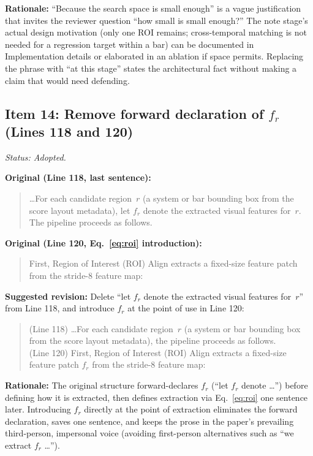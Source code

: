 \documentclass{article}
\begin{document}
\textbf{Rationale:}
``Because the search space is small enough'' is a vague justification that invites the reviewer question ``how small is small enough?'' The note stage's actual design motivation (only one ROI remains; cross-temporal matching is not needed for a regression target within a bar) can be documented in Implementation details or elaborated in an ablation if space permits. Replacing the phrase with ``at this stage'' states the architectural fact without making a claim that would need defending.

\subsection*{Item 14: Remove forward declaration of $f_r$ (Lines 118 and 120)}

\textit{Status: Adopted.}

\textbf{Original (Line 118, last sentence):}
\begin{quote}
\ldots For each candidate region~$r$ (a system or bar bounding box from the score layout metadata), let $f_r$ denote the extracted visual features for~$r$. The pipeline proceeds as follows.
\end{quote}

\textbf{Original (Line 120, Eq.~\ref{eq:roi} introduction):}
\begin{quote}
First, Region of Interest (ROI) Align \cite{he2017mask} extracts a fixed-size feature patch from the stride-8 feature map:
\end{quote}

\textbf{Suggested revision:}
Delete ``let $f_r$ denote the extracted visual features for~$r$'' from Line 118, and introduce $f_r$ at the point of use in Line 120:
\begin{quote}
(Line 118) \ldots For each candidate region~$r$ (a system or bar bounding box from the score layout metadata), the pipeline proceeds as follows.\\[4pt]
(Line 120) First, Region of Interest (ROI) Align \cite{he2017mask} extracts a fixed-size feature patch $f_r$ from the stride-8 feature map:
\end{quote}

\textbf{Rationale:}
The original structure forward-declares $f_r$ (``let $f_r$ denote \ldots'') before defining how it is extracted, then defines extraction via Eq.~\ref{eq:roi} one sentence later. Introducing $f_r$ directly at the point of extraction eliminates the forward declaration, saves one sentence, and keeps the prose in the paper's prevailing third-person, impersonal voice (avoiding first-person alternatives such as ``we extract $f_r$ \ldots'').
\end{document}
